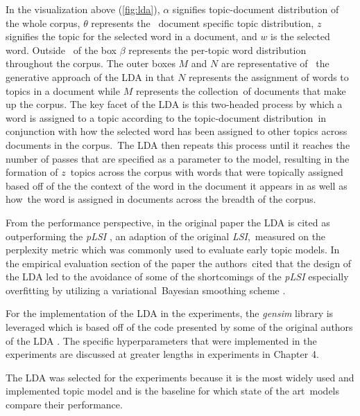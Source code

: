 \documentclass[letterpaper,12pt]{article}
\begin{document}

In the visualization above (\ref{fig:lda}), $\alpha$ signifies topic-document distribution of the whole corpus, $\theta$ represents the \
document specific topic distribution, $z$ signifies the topic for the selected word in a document, and $w$ is the selected word. Outside \
of the box $\beta$ represents the per-topic word distribution throughout the corpus. The outer boxes $M$ and $N$ are representative of \
the generative approach of the LDA in that $N$ represents the assignment of words to topics in a document while $M$ represents the collection\
of documents that make up the corpus.
The key facet of the LDA is this two-headed process by which a word is assigned to a topic according to the topic-document distribution\
in conjunction with how the selected word has been assigned to other topics across documents in the corpus.\
The LDA then repeats this process until it reaches the number of passes that are specified as a parameter to the model, resulting in the formation of $z$\
topics across the corpus with words that were topically assigned based off of the the context of the word in the document it appears in as well as how\
the word is assigned in documents across the breadth of the corpus.

From the performance perspective, in the original paper the LDA is cited as outperforming the \emph{pLSI} \cite{hofmann1999probabilistic}, an adaption of the original \emph{LSI},\
measured on the perplexity metric which was commonly used to evaluate early topic models. In the empirical evaluation section of the paper the authors\
cited that the design of the LDA led to the avoidance of some of the shortcomings of the \emph{pLSI} especially overfitting by utilizing a variational\
Bayesian smoothing scheme \cite{attias2000variational,blei2003latent}. 

For the implementation of the LDA in the experiments, the \emph{gensim} library is leveraged which is based off of the code presented by some of the original authors of the LDA \cite{hoffman2010online}.
The specific hyperparameters that were implemented in the experiments are discussed at greater lengths in experiments in Chapter 4.

The LDA was selected for the experiments because it is the most widely used and implemented topic model and is the baseline for which state of the art\
models compare their performance.
\end{document}
